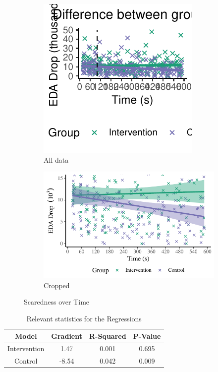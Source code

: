 \documentclass[12pt,a4paper]{article}\usepackage[]{graphicx}\usepackage[]{color}
\makeatletter
\def\maxwidth{ %
  \ifdim\Gin@nat@width>\linewidth
    \linewidth
  \else
    \Gin@nat@width
  \fi
}
\makeatother
\begin{document}
\begin{figure}[htb]
  \centering
  \begin{subfigure}[t]{.49\linewidth}


{\centering \includegraphics[width=\maxwidth]{figure/ScarednessOverTime-1} 

}



    \caption{All data}
  \end{subfigure}
  \begin{subfigure}[t]{.49\linewidth}


{\centering \includegraphics[width=\maxwidth]{figure/ScarednessOverTimeCrop-1} 

}



    \caption{Cropped}
  \end{subfigure}
  \caption{Scaredness over Time}
  \label{fig:ScarednessOverTime}
\end{figure}

\begin{table}[t]

\caption{\label{tab:RegressionTable}Relevant statistics for the Regressions}
\centering
\begin{tabular}{cccc}
\toprule
\textbf{Model} & \textbf{Gradient} & \textbf{R-Squared} & \textbf{P-Value}\\
\midrule
Intervention & 1.47 & 0.001 & 0.695\\
Control & -8.54 & 0.042 & 0.009\\
\bottomrule
\end{tabular}
\end{table}
\end{document}
